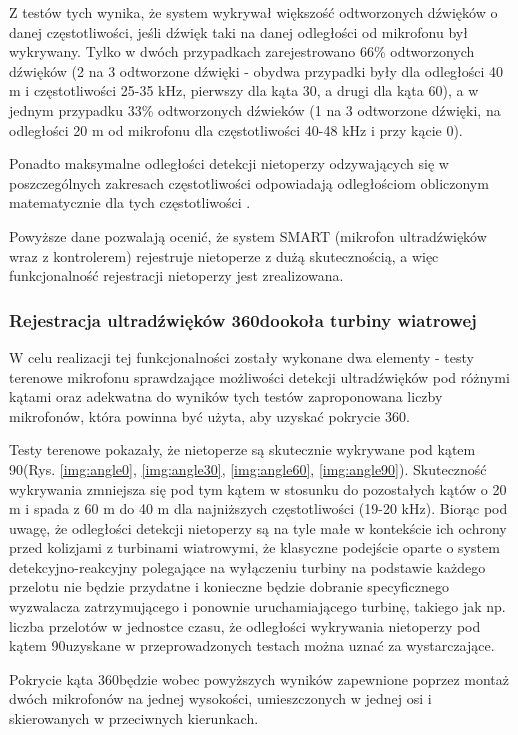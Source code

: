 \documentclass{sprz}
\begin{document}
Z testów tych wynika, że system wykrywał większość odtworzonych dźwięków o danej częstotliwości, jeśli dźwięk taki na danej odległości od mikrofonu był wykrywany. Tylko w dwóch przypadkach zarejestrowano 66\% odtworzonych dźwięków (2 na 3 odtworzone dźwięki - obydwa przypadki były dla odległości 40 m i częstotliwości 25-35 kHz, pierwszy dla kąta 30\textdegree, a drugi dla kąta 60\textdegree ), a w jednym przypadku 33\% odtworzonych dźwieków (1 na 3 odtworzone dźwięki, na odległości 20 m od mikrofonu dla częstotliwości 40-48 kHz i przy kącie 0\textdegree).

Ponadto maksymalne odległości detekcji nietoperzy odzywających się w poszczególnych zakresach częstotliwości odpowiadają odległościom obliczonym matematycznie dla tych częstotliwości \cite{agranat}. 

Powyższe dane pozwalają ocenić, że system SMART (mikrofon ultradźwięków wraz z kontrolerem) rejestruje nietoperze z dużą skutecznością, a więc funkcjonalność rejestracji nietoperzy jest zrealizowana.

\subsubsection{Rejestracja ultradźwięków 360\textdegree dookoła turbiny wiatrowej}
W celu realizacji tej funkcjonalności zostały wykonane dwa elementy - testy terenowe mikrofonu sprawdzające możliwości detekcji ultradźwięków pod różnymi kątami oraz adekwatna do wyników tych testów zaproponowana liczby mikrofonów, która powinna być użyta, aby uzyskać pokrycie 360\textdegree. 


Testy terenowe pokazały, że nietoperze są skutecznie wykrywane pod kątem 90\textdegree (Rys. \ref{img:angle0}, \ref{img:angle30}, \ref{img:angle60}, \ref{img:angle90}). Skuteczność wykrywania zmniejsza się pod tym kątem w stosunku do pozostałych kątów o 20 m i spada z 60 m do 40 m dla najniższych częstotliwości (19-20 kHz). Biorąc pod uwagę, że odległości detekcji nietoperzy są na tyle małe w kontekście ich ochrony przed kolizjami z turbinami wiatrowymi, że klasyczne podejście oparte o system detekcyjno-reakcyjny polegające
na wyłączeniu turbiny na podstawie każdego przelotu nie będzie przydatne i konieczne będzie dobranie specyficznego wyzwalacza zatrzymującego i ponownie uruchamiającego turbinę, takiego jak np. liczba przelotów w jednostce czasu, że odległości wykrywania nietoperzy pod kątem 90\textdegree uzyskane w przeprowadzonych testach można uznać za wystarczające. 

Pokrycie kąta 360\textdegree będzie wobec powyższych wyników zapewnione poprzez montaż dwóch mikrofonów na jednej wysokości, umieszczonych w jednej osi i skierowanych w przeciwnych kierunkach.
\end{document}

